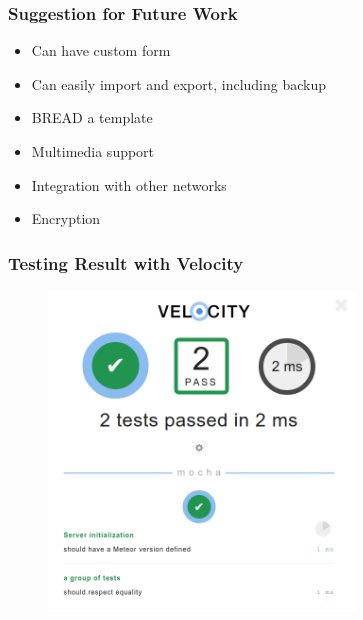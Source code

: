 \documentclass[10pt, compress]{beamer}
\begin{document}
\begin{frame}[fragile]
  \frametitle{Suggestion for Future Work}

  \begin{itemize} \itemsep0pt
    \item Can have custom form
    \item Can easily import and export, including backup
    \item \textsc{BREAD} a template
    \item Multimedia support
    \item Integration with other networks
    \item Encryption
  \end{itemize}

\end{frame}






\begin{frame}[fragile]
  \frametitle{Testing Result with Velocity}

  \begin{figure}[ht]
    \centering
    \vspace{-25pt}
    \includegraphics[height=8.5cm]{include/satellid-app-test.png}
    \vspace{-10pt}
    \label{fig:satellid-app-test}
  \end{figure}

\end{frame}
\end{document}
